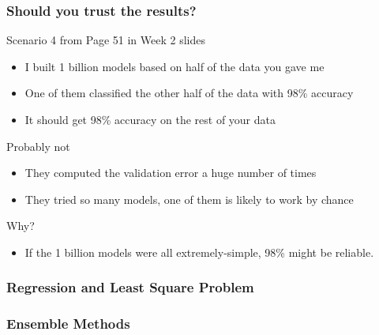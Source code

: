 \documentclass[aspectratio=169, 10pt]{beamer}
\begin{document}
\begin{frame}
    \frametitle{Should you trust the results?}
    
    Scenario 4 from Page 51 in Week 2 slides

    \begin{itemize}
        \item I built 1 billion models based on half of the data you gave me
        \item One of them classified the other half of the data with 98\% accuracy
        \item It should get 98\% accuracy on the rest of your data
    \end{itemize}

    Probably not

    \begin{itemize}
        \item They computed the validation error a huge number of times
        \item They tried so many models, one of them is likely to work by chance
    \end{itemize}

    Why?

    \begin{itemize}
        \item If the 1 billion models were all extremely-simple, 98\% might be reliable.
    \end{itemize}

\end{frame}

\begin{frame}
    \frametitle{Regression and Least Square Problem}
    
    
\end{frame}

\begin{frame}
    \frametitle{Ensemble Methods}
    
    
\end{frame}
\end{document}
